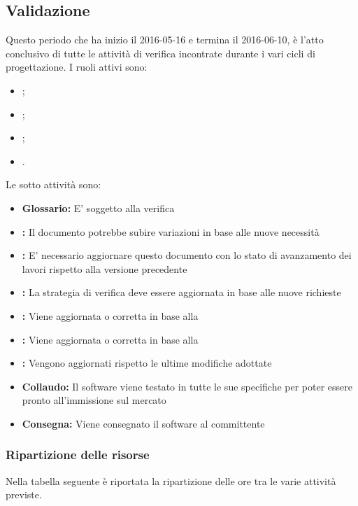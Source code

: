 \documentclass[12pt,a4paper]{article}
\begin{document}
\subsection{Validazione}
Questo periodo che ha inizio il 2016-05-16 e termina il 2016-06-10, è l'atto conclusivo di tutte le attività di verifica incontrate durante i vari cicli di progettazione. I ruoli attivi sono:
\begin{itemize}
	\item \PM{};
	\item \AM{};
	\item \PG{};
	\item \VR{}.
\end{itemize}
Le sotto attività sono:
\begin{itemize}
	\item \textbf{Glossario:} 
	E' soggetto alla verifica
	\item \textbf{\NdP{}:}
	Il documento potrebbe subire variazioni in base alle nuove necessità
	\item \textbf{\PdP{}:}
	E' necessario aggiornare questo documento con lo stato di avanzamento dei lavori rispetto alla versione precedente
	\item \textbf{\PdQ{}:}
	La strategia di verifica deve essere aggiornata in base alle nuove richieste
	\item \textbf{\DP:}
	Viene aggiornata o corretta in base alla \RQ{}
	\item \textbf{\ST:}
	Viene aggiornata o corretta in base alla \RQ{}
	\item \textbf{\MU:}
	Vengono aggiornati rispetto le ultime modifiche adottate
	\item \textbf{Collaudo:}
	Il software viene testato in tutte le sue specifiche per poter essere pronto all'immissione sul mercato
	\item \textbf{Consegna:}
	Viene consegnato il software al committente
\end{itemize}

\newpage
\subsubsection{Ripartizione delle risorse}
Nella tabella seguente è riportata la ripartizione delle ore tra le varie attività previste.
\end{document}
